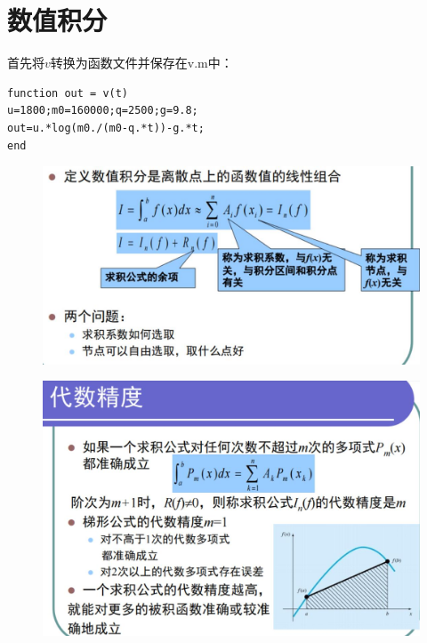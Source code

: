 \documentclass[a4paper,12pt]{ctexart}
\begin{document}
\newpage
\tableofcontents

\newpage
\section{数值积分}
首先将$v$转换为函数文件并保存在v.m中：
\begin{lstlisting}
function out = v(t)
u=1800;m0=160000;q=2500;g=9.8;
out=u.*log(m0./(m0-q.*t))-g.*t;
end
\end{lstlisting}

\begin{figure}[H]
    \centering
    \includegraphics[width=14cm]{第五章作业/shuzhijifen.jpg}
\end{figure}
\begin{figure}[H]
    \centering
    \includegraphics[width=14cm]{第五章作业/daishujingdu.jpg}
\end{figure}
\end{document}
